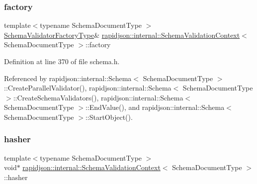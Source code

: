 \mbox{\label{structrapidjson_1_1internal_1_1_schema_validation_context_ad94e31d9986a4ee521a0c51d74717242}} 
\subsubsection{\texorpdfstring{factory}{factory}}
{\footnotesize\ttfamily template$<$typename Schema\+Document\+Type $>$ \\
\mbox{\hyperlink{structrapidjson_1_1internal_1_1_schema_validation_context_a1065fcde55a4928092fd576743e68e99}{Schema\+Validator\+Factory\+Type}}\& \mbox{\hyperlink{structrapidjson_1_1internal_1_1_schema_validation_context}{rapidjson\+::internal\+::\+Schema\+Validation\+Context}}$<$ Schema\+Document\+Type $>$\+::factory}



Definition at line 370 of file schema.\+h.



Referenced by rapidjson\+::internal\+::\+Schema$<$ Schema\+Document\+Type $>$\+::\+Create\+Parallel\+Validator(), rapidjson\+::internal\+::\+Schema$<$ Schema\+Document\+Type $>$\+::\+Create\+Schema\+Validators(), rapidjson\+::internal\+::\+Schema$<$ Schema\+Document\+Type $>$\+::\+End\+Value(), and rapidjson\+::internal\+::\+Schema$<$ Schema\+Document\+Type $>$\+::\+Start\+Object().

\mbox{\label{structrapidjson_1_1internal_1_1_schema_validation_context_ac70bbdca3f5f1be8ba2bc0ab6eeb6b91}} 
\subsubsection{\texorpdfstring{hasher}{hasher}}
{\footnotesize\ttfamily template$<$typename Schema\+Document\+Type $>$ \\
void$\ast$ \mbox{\hyperlink{structrapidjson_1_1internal_1_1_schema_validation_context}{rapidjson\+::internal\+::\+Schema\+Validation\+Context}}$<$ Schema\+Document\+Type $>$\+::hasher}



